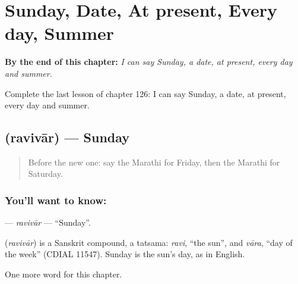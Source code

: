 
\chapter{Sunday, Date, At present, Every day, Summer}
\label{ch:mr-sunday-date-at-present-every-day-summer}

\begin{chapteropening}
\textbf{By the end of this chapter:} \emph{I can say Sunday, a date, at present, every day and summer.}

Complete the last lesson of chapter 126: I can say Sunday, a date, at present, every day and summer.
\end{chapteropening}

\section[\texorpdfstring{\mr{रविवार} (ravivār)}{रविवार (ravivār)}]{ (ravivār) — Sunday}

\label{lesson:MR-C126-ravivar}



\begin{quote}
Before the new one: say the Marathi for Friday, then the Marathi for Saturday.
\end{quote}

\subsection*{You'll want to know: }
\textbf{} — \emph{ravivār} — \textquotedblleft{}Sunday\textquotedblright{}.

\begin{cousinweb}
\textbf{} (\emph{ravivār}) is a Sanskrit compound, a tatsama: \emph{ravi}, \textquotedblleft{}the sun\textquotedblright{}, and \emph{vāra}, \textquotedblleft{}day of the week\textquotedblright{} (CDIAL 11547). Sunday is the sun's day, as in English.
\end{cousinweb}

\begin{grammarlens}[title={What you've built}]
One more word for this chapter.
\end{grammarlens}

